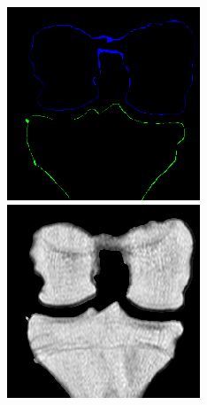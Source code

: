 \begin{figure}[H]
\endminipage\hfill
{}%
  \includegraphics[width=\linewidth]{imgs/c3.png}
\endminipage\hfill
{}%
  \includegraphics[width=\linewidth]{imgs/d3.png}

\end{figure}
